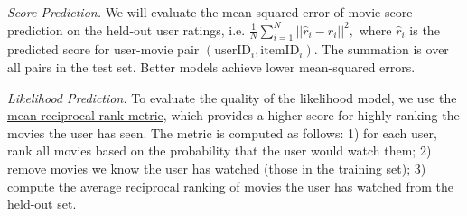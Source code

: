 \documentclass[12pt]{article}
\begin{document}
\vspace{0.2cm}
\noindent \emph{Score Prediction.} We will evaluate the mean-squared error of movie score prediction on the held-out user ratings, i.e.
    $
        \frac{1}{N}\sum_{i=1}^N ||\hat{r}_i-r_i||^2,
    $
    where $\hat{r}_i$ is the predicted score for user-movie pair $(\text{userID}_i,\text{itemID}_i)$. The summation is over all pairs in the test set. Better models achieve lower mean-squared errors.
    
    \vspace{0.2cm}
    \noindent \emph{Likelihood Prediction.}  
    To evaluate the quality of the likelihood model, we use the \href{https://en.wikipedia.org/wiki/Mean_reciprocal_rank} {mean reciprocal rank metric}, which provides a higher score for highly ranking the movies the user has seen. The metric is computed as follows: 1) for each user, rank all movies based on the probability that the user would watch them; 2) remove movies we know the user has watched (those in the training set); 3) compute the average reciprocal ranking of movies the user has watched from the held-out set. 
    
\end{document}
